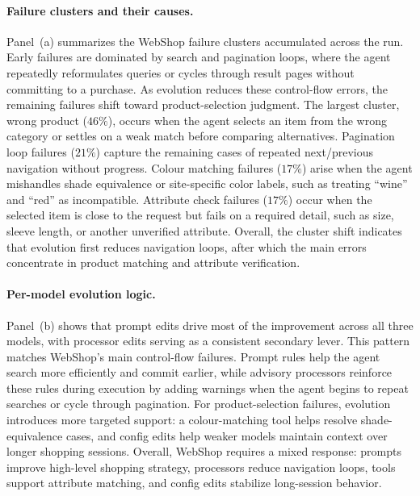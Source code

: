 \paragraph{Failure clusters and their causes.}
Panel~(a) summarizes the WebShop failure clusters accumulated across the run. Early failures are dominated by search and pagination loops, where the agent repeatedly reformulates queries or cycles through result pages without committing to a purchase. As evolution reduces these control-flow errors, the remaining failures shift toward product-selection judgment. The largest cluster, wrong product ($46\%$), occurs when the agent selects an item from the wrong category or settles on a weak match before comparing alternatives. Pagination loop failures ($21\%$) capture the remaining cases of repeated next/previous navigation without progress. Colour matching failures ($17\%$) arise when the agent mishandles shade equivalence or site-specific color labels, such as treating ``wine'' and ``red'' as incompatible. Attribute check failures ($17\%$) occur when the selected item is close to the request but fails on a required detail, such as size, sleeve length, or another unverified attribute. Overall, the cluster shift indicates that evolution first reduces navigation loops, after which the main errors concentrate in product matching and attribute verification.

\paragraph{Per-model evolution logic.}
Panel~(b) shows that prompt edits drive most of the improvement across all three models, with processor edits serving as a consistent secondary lever. This pattern matches WebShop's main control-flow failures. Prompt rules help the agent search more efficiently and commit earlier, while advisory processors reinforce these rules during execution by adding warnings when the agent begins to repeat searches or cycle through pagination. For product-selection failures, evolution introduces more targeted support: a colour-matching tool helps resolve shade-equivalence cases, and config edits help weaker models maintain context over longer shopping sessions. Overall, WebShop requires a mixed response: prompts improve high-level shopping strategy, processors reduce navigation loops, tools support attribute matching, and config edits stabilize long-session behavior.

